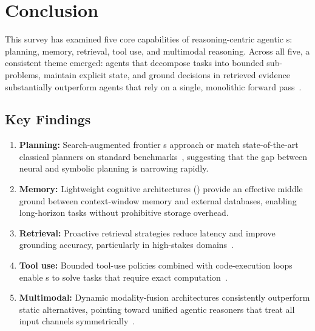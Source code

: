 \chapter{Conclusion}
\label{chap:conclusion}

This survey has examined five core capabilities of reasoning-centric agentic
\LLM{}s: planning, memory, retrieval, tool use, and multimodal reasoning.
Across all five, a consistent theme emerged: agents that decompose tasks
into bounded sub-problems, maintain explicit state, and ground decisions in
retrieved evidence substantially outperform agents that rely on a single,
monolithic forward pass~\cite{wei2026agenticreasoning,ke2025reasoningfrontiers}.

\section{Key Findings}
\label{sec:conclusion-findings}

\begin{enumerate}
  \item \textbf{Planning:} Search-augmented frontier \LLM{}s approach or
        match state-of-the-art classical planners on standard
        benchmarks~\cite{correa2025planningperformance}, suggesting that
        the gap between neural and symbolic planning is narrowing rapidly.

  \item \textbf{Memory:} Lightweight cognitive architectures
        (\cite{huang2025licomemory,chen2025telemem}) provide an effective
        middle ground between context-window memory and external databases,
        enabling long-horizon tasks without prohibitive storage overhead.

  \item \textbf{Retrieval:} Proactive retrieval strategies reduce latency
        and improve grounding accuracy, particularly in high-stakes
        domains~\cite{wang2025proactiveretrievalmedical}.

  \item \textbf{Tool use:} Bounded tool-use policies combined with
        code-execution loops enable \LLM{}s to solve tasks that require
        exact computation~\cite{liu2025agenticmath}.

  \item \textbf{Multimodal:} Dynamic modality-fusion architectures
        consistently outperform static alternatives, pointing toward
        unified agentic reasoners that treat all input channels
        symmetrically~\cite{yao2025multimodalsurvey}.
\end{enumerate}

